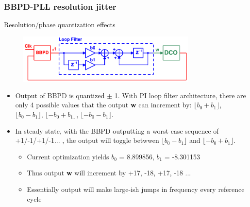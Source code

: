 \documentclass[t, screen, aspectratio=43]{beamer}
\begin{document}
\begin{frame}
	\frametitle{BBPD-PLL resolution jitter}
	\begin{block}{Resolution/phase quantization effects}
		\begin{figure}
			\includegraphics[width=0.8\textwidth, angle=0]{simplified_bbpll}
		\end{figure}
		\begin{itemize}[itemsep=4pt,label=\protect---]
			\tiny
			\item Output of BBPD is quantized $\pm$ 1. With PI loop filter architecture, there are only 4 possible values that the output {\color{teal}\textbf{w}} can increment by: $\lfloor b_0+b_1 \rfloor$, $\lfloor b_0-b_1 \rfloor$, $\lfloor -b_0+b_1 \rfloor$, $\lfloor -b_0-b_1 \rfloor$.
			\item In steady state, with the BBPD outputting a worst case sequence of +1/-1/+1/-1... , the output will toggle betwwen $\lfloor b_0-b_1 \rfloor$ and $\lfloor -b_0+b_1 \rfloor$.
			\begin{itemize}[itemsep=4pt,label=\protect$\bullet$]
				\item Current optimization yields $b_0$ = 8.899856, $b_1$ = -8.301153 
				\item Thus output {\color{teal}\textbf{w}} will increment by +17, -18, +17, -18 ...
				\item Essentially output will make large-ish jumps in frequency every reference cycle
			\end{itemize}
		\end{itemize}
		\tiny
	\end{block}	
\end{frame}
\end{document}
